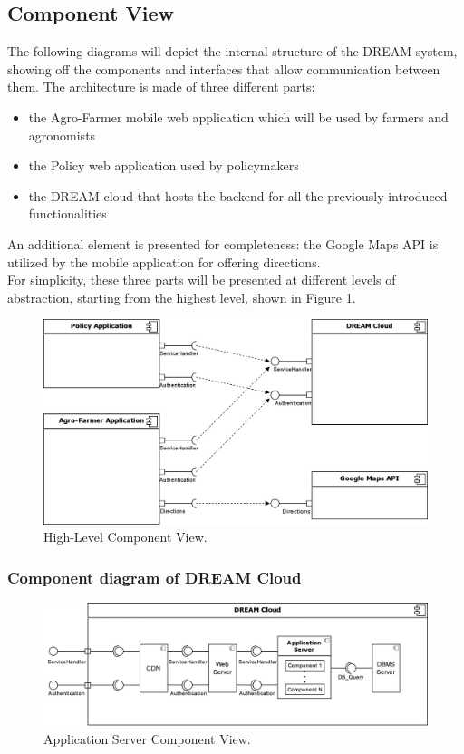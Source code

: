 \subsection{Component View}

The following diagrams will depict the internal structure of the DREAM system, showing off the components and interfaces that allow communication between them. The architecture is made of three different parts:
\begin{itemize}
	\item the Agro-Farmer mobile web application which will be used by farmers and agronomists
	\item the Policy web application used by policymakers
	\item the DREAM cloud that hosts the backend for all the previously introduced functionalities
\end{itemize}
An additional element is presented for completeness: the Google Maps API is utilized by the mobile application for offering directions. \\
For simplicity, these three parts will be presented at different levels of abstraction, starting from the highest level, shown in Figure \ref{fig:highLevelComp}.\\

\begin{figure}[hbt!]
\centering
\includegraphics[width=\textwidth]{../images_diagrams/dd/high_level_cloud.png}
\caption{High-Level Component View.}
\label{fig:highLevelComp}
\end{figure}

\subsubsection{Component diagram of DREAM Cloud}

\begin{figure}[hbt!]
\centering
\includegraphics[width=\textwidth]{../images_diagrams/dd/component_only_cloud.png}
\caption{Application Server Component View.}
\label{fig:CloudOnlyComp}
\end{figure}

